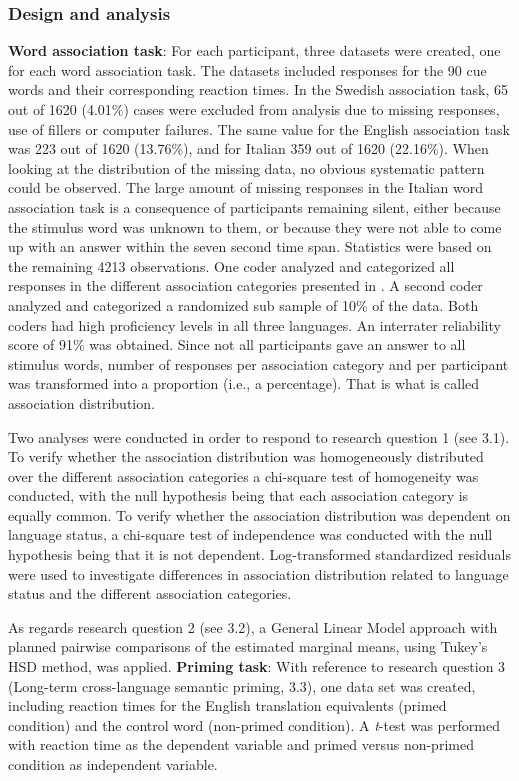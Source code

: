 \documentclass[output=paper,colorlinks,citecolor=brown,nonflat]{langsci/langscibook}
\begin{document}
\subsubsection{Design and analysis}\label{sec:gudmundson:2.2.4}

\textbf{Word association task}: For each participant, three datasets were created, one for each word association task. The datasets included responses for the 90 cue words and their corresponding reaction times. In the Swedish association task, 65 out of 1620 (4.01\%) cases were excluded from analysis due to missing responses, use of fillers or computer failures. The same value for the English association task was 223 out of 1620 (13.76\%), and for Italian 359 out of 1620 (22.16\%). When looking at the distribution of the missing data, no obvious systematic pattern could be observed. The large amount of missing responses in the Italian word association task is a consequence of participants remaining silent, either because the stimulus word was unknown to them, or because they were not able to come up with an answer within the seven second time span. Statistics were based on the remaining 4213 observations. One coder analyzed and categorized all responses in the different association categories presented in . A second coder analyzed and categorized a randomized sub sample of 10\% of the data. Both coders had high proficiency levels in all three languages. An interrater reliability score of 91\% was obtained.  Since not all participants gave an answer to all stimulus words, number of responses per association category and per participant was transformed into a proportion (i.e., a percentage). That is what is called association distribution.

Two analyses were conducted in order to respond to research question 1 (see 3.1). To verify whether the association distribution was homogeneously distributed over the different association categories a chi-square test of homogeneity was conducted, with the null hypothesis being that each association category is equally common. To verify whether the association distribution was dependent on language status, a chi-square test of independence was conducted with the null hypothesis being that it is not dependent. Log-transformed standardized residuals were used to investigate differences in association distribution related to language status and the different association categories.

As regards research question 2 (see 3.2), a General Linear Model approach with planned pairwise comparisons of the estimated marginal means, using Tukey’s HSD method, was applied.
\textbf{Priming task}: With reference to research question 3 (Long-term cross-language semantic priming, 3.3), one data set was created, including reaction times for the English translation equivalents (primed condition) and the control word (non-primed condition). A \textit{t}{}-test was performed with reaction time as the dependent variable and primed versus non-primed condition as independent variable.
\end{document}
